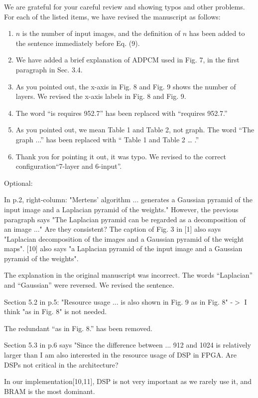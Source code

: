 \documentclass[a4j]{jsarticle}
\begin{document}
\noindent
We are grateful for your careful review and showing typos and
other problems. For each of the listed items, we have revised
the manuscript as follows:
\begin{enumerate}
  \item $\mathit{n}$ is the number of input images, and the definition of $\mathit{n}$ has been added to the sentence immediately before Eq. (9).
  \item We have added a brief explanation of ADPCM used in Fig. 7, in the first paragraph in Sec. 3.4.
  \item As you pointed out, the x-axis in Fig. 8 and Fig. 9 shows the number of layers. We revised the x-axis labels in Fig. 8 and Fig. 9.
  \item The word “is requires 952.7” has been replaced with “requires 952.7.”
  \item As you pointed out, we mean Table 1 and Table 2, not graph. The word “The graph ...” has been replaced with “ Table 1 and Table 2 … .” 
  \item Thank you for pointing it out, it was typo. We revised to the correct configuration``7-layer and 6-input''.
\end{enumerate}

\begin{screen}
Optional:

In p.2, right-column: "Mertens' algorithm ... generates a Gaussian pyramid of the input image and a Laplacian pyramid of the weights."
However, the previous paragraph says "The Laplacian pyramid can be regarded as a decomposition of an image ..."
Are they consistent?
The caption of Fig. 3 in [1] also says "Laplacian decomposition of the images and a Gaussian pyramid of the weight maps".
[10] also says "a Laplacian pyramid of the input image and a Gaussian pyramid of the weights".
\end{screen}
The explanation in the original manuscript was incorrect. 
The words ``Laplacian'' and ``Gaussian'' were reversed. 
We revised the sentence.

\vspace{0.3cm}
\begin{screen}
Section 5.2 in p.5: "Resource usage ... is also shown in Fig. 9 as in Fig. 8"
-$>$ I think "as in Fig. 8" is not needed.
\end{screen}
The redundant “as in Fig. 8.” has been removed.

\vspace{0.3cm}
\begin{screen}
Section 5.3 in p.6 says "Since the difference between ... 912 and 1024 is relatively larger than
I am also interested in the resource usage of DSP in FPGA. Are DSPs not critical in the architecture?
\end{screen}
In our implementation[10,11], DSP is not very important as we rarely use it, and BRAM is the most dominant.
\end{document}
